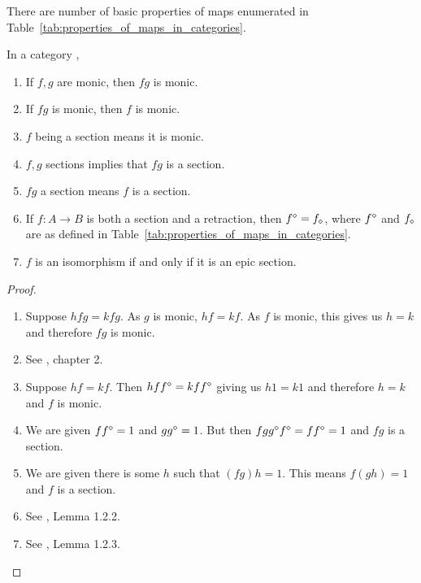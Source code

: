 There are number of basic properties of maps enumerated in Table~\ref{tab:properties_of_maps_in_categories}.

\begin{lemma}\label{lem:categorical_properties_of_maps}
  In a category \B,
  \begin{enumerate}[{(}i{)}]
    \item If $f,g$ are monic, then $f g$ is monic.
    \item If $f g$ is monic, then $f$ is monic.
    \item $f$ being a section means it is monic.
    \item $f, g$ sections implies that $f g$ is a section.
    \item $f g$ a section means $f$ is a section.
    \item If $f:A \to B$ is both a section and a retraction, then ${f}^\diamond = {f}_\diamond$, where ${f}^\diamond$ and ${f}_\diamond$ are as
      defined in Table~\ref{tab:properties_of_maps_in_categories}.
    \item  $f$ is an isomorphism if and only if it is an epic section.
  \end{enumerate}
\end{lemma}
\begin{proof}
  \prepprooflist
  \begin{enumerate}[{(}i{)}]
    \item Suppose $h f g = k f g$. As $g$ is monic, $h f = k f$. As $f$ is monic, this gives us $h =
      k$ and therefore $f g$ is monic.
    \item See \cite{barr:ctcs}, chapter 2.
    \item Suppose $h f = k f$. Then $h f {f}^\diamond = k f {f}^\diamond$ giving us $h
      1 = k 1$ and therefore $h = k$  and $f$ is monic.
    \item We are given $f{f}^\diamond =1$ and $g{g}^\diamond =1 $. But then $f g
      {g}^\diamond{f}^\diamond = f {f}^\diamond = 1$ and $f g$ is a section.
    \item We are given there is some $h$ such that $(f g) h = 1$. This means $f (g h) =1$ and $f$ is
      a section.
    \item See \cite{cockett2009:ctcs}, Lemma 1.2.2.
    \item See \cite{cockett2009:ctcs}, Lemma 1.2.3.
  \end{enumerate}

\end{proof}

